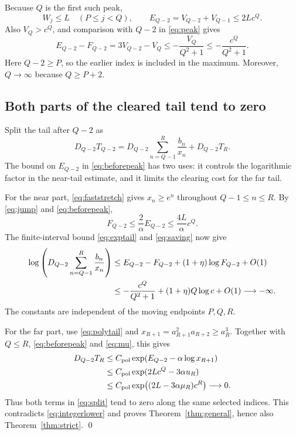 \documentclass[11pt]{article}
\numberwithin{equation}{section}
\begin{document}
Because $Q$ is the first such peak,
\begin{equation}\label{eq:beforepeak}
  W_j\le L\quad(P\le j<Q),\qquad
  E_{Q-2}=V_{Q-2}+V_{Q-1}\le2Lc^Q.
\end{equation}
Also $V_Q>c^Q$, and comparison with $Q-2$ in \eqref{eq:peak} gives
\begin{equation}\label{eq:saving}
  E_{Q-2}-F_{Q-2}=3V_{Q-2}-V_Q
  \le-\frac{V_Q}{Q^2+1}
  \le-\frac{c^Q}{Q^2+1}.
\end{equation}
Here $Q-2\ge P$, so the earlier index is included in the maximum.
Moreover, $Q\to\infty$ because $Q\ge P+2$.

\subsection{Both parts of the cleared tail tend to zero}

Split the tail after $Q-2$ as
\begin{equation}\label{eq:split}
  D_{Q-2}T_{Q-2}
  =D_{Q-2}\sum_{n=Q-1}^{R}\frac{b_n}{x_n}
   +D_{Q-2}T_R.
\end{equation}
The bound on $E_{Q-2}$ in \eqref{eq:beforepeak} has two uses: it
controls the logarithmic factor in the near-tail estimate, and it
limits the clearing cost for the far tail.

For the near part, \eqref{eq:faststretch} gives $x_n\ge e^n$
throughout $Q-1\le n\le R$. By \eqref{eq:jump} and
\eqref{eq:beforepeak},
\[
  F_{Q-2}\le\frac{2}{\alpha}E_{Q-2}
          \le\frac{4L}{\alpha}c^Q.
\]
The finite-interval bound \eqref{eq:exptail} and
\eqref{eq:saving} now give
\begin{align}
  \log\left(D_{Q-2}\sum_{n=Q-1}^{R}\frac{b_n}{x_n}\right)
  &\le E_{Q-2}-F_{Q-2}+(1+\eta)\log F_{Q-2}+O(1)\notag\\
  &\le-\frac{c^Q}{Q^2+1}+(1+\eta)Q\log c+O(1)
       \longrightarrow-\infty. \label{eq:near}
\end{align}
The constants are independent of the moving endpoints $P,Q,R$.

For the far part, use \eqref{eq:polytail} and
$x_{R+1}=a_{R+1}^2a_{R+2}\ge a_R^3$. Together with $Q\le R$,
\eqref{eq:beforepeak} and \eqref{eq:mu}, this gives
\begin{align}
  D_{Q-2}T_R
  &\le C_{\mathrm{pol}}\exp(E_{Q-2}-\alpha\log x_{R+1})\notag\\
  &\le C_{\mathrm{pol}}\exp(2Lc^Q-3\alpha u_R)\notag\\
  &\le C_{\mathrm{pol}}\exp\bigl((2L-3\alpha\mu_R)c^R\bigr)
       \longrightarrow0. \label{eq:far}
\end{align}
Thus both terms in \eqref{eq:split} tend to zero along the same
selected indices. This contradicts \eqref{eq:integerlower} and
proves Theorem~\ref{thm:general}, hence also
Theorem~\ref{thm:strict}. \qed
\end{document}

